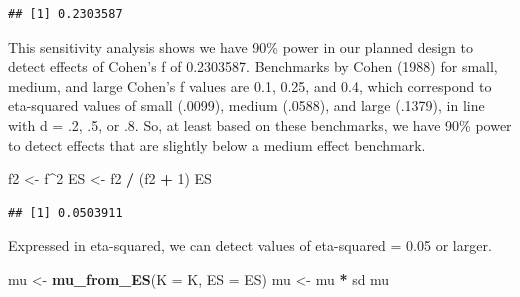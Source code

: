 \documentclass[]{book}
\newenvironment{Shaded}{\begin{snugshade}}{\end{snugshade}}
\newcommand{\CommentTok}[1]{\textcolor[rgb]{0.56,0.35,0.01}{\textit{#1}}}
\newcommand{\DataTypeTok}[1]{\textcolor[rgb]{0.13,0.29,0.53}{#1}}
\newcommand{\DecValTok}[1]{\textcolor[rgb]{0.00,0.00,0.81}{#1}}
\newcommand{\FloatTok}[1]{\textcolor[rgb]{0.00,0.00,0.81}{#1}}
\newcommand{\KeywordTok}[1]{\textcolor[rgb]{0.13,0.29,0.53}{\textbf{#1}}}
\newcommand{\NormalTok}[1]{#1}
\newcommand{\OperatorTok}[1]{\textcolor[rgb]{0.81,0.36,0.00}{\textbf{#1}}}
\newcommand{\StringTok}[1]{\textcolor[rgb]{0.31,0.60,0.02}{#1}}
\begin{document}
\begin{Shaded}
\end{Shaded}

\begin{verbatim}
## [1] 0.2303587
\end{verbatim}

This sensitivity analysis shows we have 90\% power in our planned design to detect effects of Cohen's f of 0.2303587. Benchmarks by Cohen (1988) for small, medium, and large Cohen's f values are 0.1, 0.25, and 0.4, which correspond to eta-squared values of small (.0099), medium (.0588), and large (.1379), in line with d = .2, .5, or .8. So, at least based on these benchmarks, we have 90\% power to detect effects that are slightly below a medium effect benchmark.

\begin{Shaded}
\begin{Highlighting}[]
\NormalTok{f2 <-}\StringTok{ }\NormalTok{f}\OperatorTok{^}\DecValTok{2}
\NormalTok{ES <-}\StringTok{ }\NormalTok{f2 }\OperatorTok{/}\StringTok{ }\NormalTok{(f2 }\OperatorTok{+}\StringTok{ }\DecValTok{1}\NormalTok{)}
\NormalTok{ES}
\end{Highlighting}
\end{Shaded}

\begin{verbatim}
## [1] 0.0503911
\end{verbatim}

Expressed in eta-squared, we can detect values of eta-squared = 0.05 or larger.

\begin{Shaded}
\begin{Highlighting}[]
\NormalTok{mu <-}\StringTok{ }\KeywordTok{mu_from_ES}\NormalTok{(}\DataTypeTok{K =}\NormalTok{ K, }\DataTypeTok{ES =}\NormalTok{ ES)}
\NormalTok{mu <-}\StringTok{ }\NormalTok{mu }\OperatorTok{*}\StringTok{ }\NormalTok{sd}
\NormalTok{mu}
\end{Highlighting}
\end{Shaded}
\end{document}
